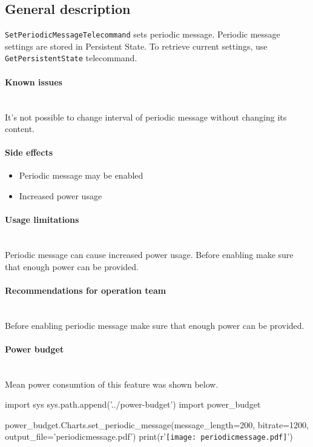 

\subsection{General description}
\texttt{SetPeriodicMessageTelecommand} sets periodic message. Periodic message settings are stored in Persistent State. To retrieve current settings, use \texttt{GetPersistentState} telecommand. 

\paragraph{Known issues} \mbox{} \\
It's not possible to change interval of periodic message without changing its content.

\paragraph{Side effects}
\begin{itemize}
    \item Periodic message may be enabled
    \item Increased power usage
\end{itemize}

\paragraph{Usage limitations} \mbox{} \\
Periodic message can cause increased power usage. Before enabling make sure that enough power can be provided.

\paragraph{Recommendations for operation team} \mbox{} \\
Before enabling periodic message make sure that enough power can be provided.

\paragraph{Power budget} \mbox{} \\
Mean power consumtion of this feature was shown below.

\begin{center}
\begin{pycode}
import sys
sys.path.append('../power-budget')
import power_budget

power_budget.Charts.set_periodic_message(message_length=200, bitrate=1200, output_file='periodicmessage.pdf')
print(r'\texttt{[image: periodicmessage.pdf]}')
\end{pycode}
\end{center}

